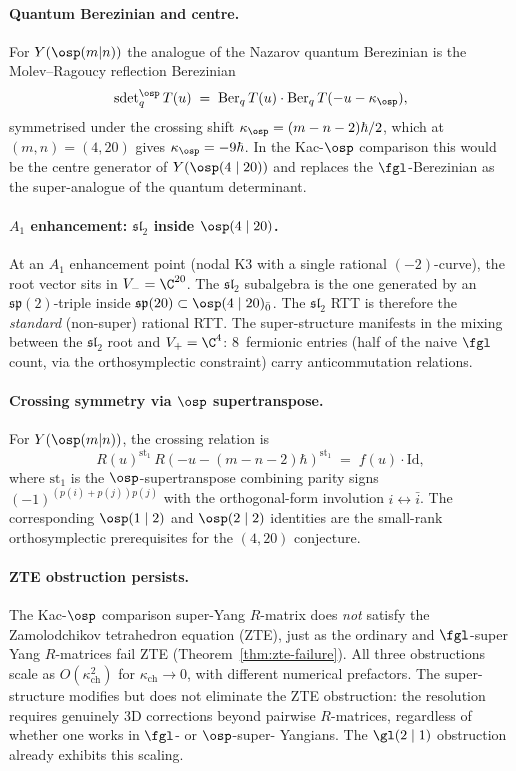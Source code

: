 \paragraph{Quantum Berezinian and centre.}
For $Y(\osp(m|n))$ the analogue of the Nazarov quantum Berezinian
is the Molev--Ragoucy reflection Berezinian
\[
 \operatorname{sdet}_q^{\osp} T(u)
 \;=\;
 \operatorname{Ber}_q T(u) \cdot \operatorname{Ber}_q T(-u - \kappa_{\osp}),
\]
symmetrised under the crossing shift $\kappa_{\osp} = (m - n - 2)\hbar/2$,
which at $(m, n) = (4, 20)$ gives $\kappa_{\osp} = -9\hbar$. In the
Kac-$\osp$ comparison this would be the centre generator of $Y(\osp(4 \mid 20))$ and replaces the
$\fgl$-Berezinian as the super-analogue of the quantum
determinant.

\paragraph{\texorpdfstring{$A_1$}{A-1} enhancement: \texorpdfstring{$\mathfrak{sl}_2$}{sl-2} inside \texorpdfstring{$\osp(4 \mid 20)$}{osp(4 mid 20)}.}
At an $A_1$ enhancement point (nodal K3 with a single rational
$(-2)$-curve), the root vector sits in $V_- = \C^{20}$. The
$\mathfrak{sl}_2$ subalgebra is the one generated by an
$\mathfrak{sp}(2)$-triple inside $\mathfrak{sp}(20) \subset
\osp(4 \mid 20)_{\bar 0}$. The $\mathfrak{sl}_2$ RTT is therefore
the \emph{standard} (non-super) rational RTT. The super-structure
manifests in the mixing between the $\mathfrak{sl}_2$ root and
$V_+ = \C^4$: $8$~fermionic entries (half of the naive $\fgl$
count, via the orthosymplectic constraint) carry
anticommutation relations.

\paragraph{Crossing symmetry via \texorpdfstring{$\osp$}{osp} supertranspose.}
For $Y(\osp(m|n))$, the crossing relation is
\[
 R(u)^{\mathrm{st}_1}\, R(-u - (m-n-2)\hbar)^{\mathrm{st}_1}
 \;=\; f(u) \cdot \mathrm{Id},
\]
where $\mathrm{st}_1$ is the $\osp$-supertranspose combining
parity signs $(-1)^{(p(i)+p(j))p(j)}$ with the orthogonal-form
involution $i \leftrightarrow \bar i$. The corresponding
$\osp(1 \mid 2)$ and $\osp(2 \mid 2)$ identities are the small-rank
orthosymplectic prerequisites for the $(4,20)$ conjecture.

\paragraph{ZTE obstruction persists.}
The Kac-$\osp$ comparison super-Yang $R$-matrix does \emph{not} satisfy
the Zamolodchikov tetrahedron equation (ZTE), just as the
ordinary and $\fgl$-super Yang $R$-matrices fail ZTE
(Theorem~\ref{thm:zte-failure}). All three obstructions scale as
$O(\kappa_{\mathrm{ch}}^2)$ for $\kappa_{\mathrm{ch}} \to 0$, with
different numerical prefactors. The super-structure modifies
but does not eliminate the ZTE obstruction: the resolution
requires genuinely 3D corrections beyond pairwise $R$-matrices,
regardless of whether one works in $\fgl$- or $\osp$-super-
Yangians. The $\gl(2 \mid 1)$ obstruction already exhibits this
scaling.

